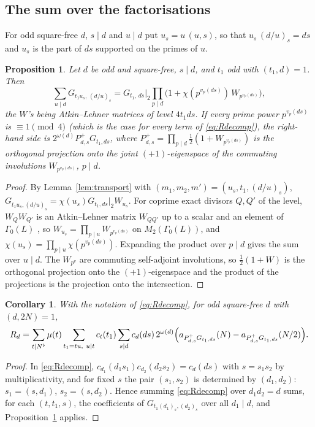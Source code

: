 \documentclass[11pt,a4paper]{article}
\newtheorem{proposition}[theorem]{Proposition}
\newtheorem{corollary}[theorem]{Corollary}
\theoremstyle{remark}
\theoremstyle{definition}
\begin{document}
\subsection{The sum over the factorisations}
For odd square-free $d$, $s\mid d$ and $u\mid d$ put $u_s=u\,(u,s)$, so that $u_s\,(d/u)_s=ds$ and $u_s$ is the part of $ds$ supported on the primes of $u$.

\begin{proposition}\label{prop:sym}
Let $d$ be odd and square-free, $s\mid d$, and $t_1$ odd with $(t_1,d)=1$. Then
\[
\sum_{u\mid d}G_{t_1u_s,\,(d/u)_s}=G_{t_1,\,ds}\Big|_2\prod_{p\mid d}\bigl(1+\chi(p^{v_p(ds)})\,W_{p^{v_p(ds)}}\bigr),
\]
the $W$'s being Atkin--Lehner matrices of level $4t_1ds$. If every prime power $p^{v_p(ds)}$ is $\equiv1\pmod4$ (which is the case for every term of \eqref{eq:Rdecomp}), the right-hand side is $2^{\omega(d)}P^+_{d,s}G_{t_1,ds}$, where $P^+_{d,s}=\prod_{p\mid d}\frac12(1+W_{p^{v_p(ds)}})$ is the orthogonal projection onto the joint $(+1)$-eigenspace of the commuting involutions $W_{p^{v_p(ds)}}$, $p\mid d$.
\end{proposition}
\begin{proof}
By Lemma~\ref{lem:transport} with $(m_1,m_2,m')=(u_s,t_1,(d/u)_s)$, $G_{t_1u_s,(d/u)_s}=\chi(u_s)G_{t_1,ds}|_2W_{u_s}$. For coprime exact divisors $Q,Q'$ of the level, $W_QW_{Q'}$ is an Atkin--Lehner matrix $W_{QQ'}$ up to a scalar and an element of $\Gamma_0(L)$ \cite{AL}, so $W_{u_s}=\prod_{p\mid u}W_{p^{v_p(ds)}}$ on $M_2(\Gamma_0(L))$, and $\chi(u_s)=\prod_{p\mid u}\chi(p^{v_p(ds)})$. Expanding the product over $p\mid d$ gives the sum over $u\mid d$. The $W_{p^{v}}$ are commuting self-adjoint involutions, so $\frac12(1+W)$ is the orthogonal projection onto the $(+1)$-eigenspace and the product of the projections is the projection onto the intersection.
\end{proof}

\begin{corollary}\label{cor:Rd}
With the notation of \eqref{eq:Rdecomp}, for odd square-free $d$ with $(d,2N)=1$,
\[
R_d=\sum_{t\mid N^\flat}\mu(t)\sum_{t_1=tu,\ u\mid t}c_t(t_1)\sum_{s\mid d}c_d(ds)\,2^{\omega(d)}\Bigl(a_{P^+_{d,s}G_{t_1,ds}}(N)-a_{P^+_{d,s}G_{t_1,ds}}(N/2)\Bigr).
\]
\end{corollary}
\begin{proof}
In \eqref{eq:Rdecomp}, $c_{d_1}(d_1s_1)c_{d_2}(d_2s_2)=c_d(ds)$ with $s=s_1s_2$ by multiplicativity, and for fixed $s$ the pair $(s_1,s_2)$ is determined by $(d_1,d_2)$: $s_1=(s,d_1)$, $s_2=(s,d_2)$. Hence summing \eqref{eq:Rdecomp} over $d_1d_2=d$ sums, for each $(t,t_1,s)$, the coefficients of $G_{t_1(d_1)_s,(d_2)_s}$ over all $d_1\mid d$, and Proposition~\ref{prop:sym} applies.
\end{proof}
\end{document}
